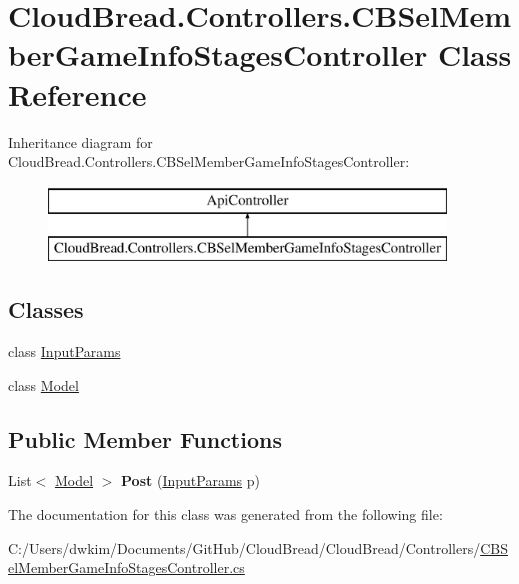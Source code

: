 \hypertarget{a00052}{}\section{Cloud\+Bread.\+Controllers.\+C\+B\+Sel\+Member\+Game\+Info\+Stages\+Controller Class Reference}
\label{a00052}
Inheritance diagram for Cloud\+Bread.\+Controllers.\+C\+B\+Sel\+Member\+Game\+Info\+Stages\+Controller\+:\begin{figure}[H]
\begin{center}
\leavevmode
\includegraphics[height=2.000000cm]{a00052}
\end{center}
\end{figure}
\subsection*{Classes}
\begin{DoxyCompactItemize}
\item 
class \hyperlink{a00096}{Input\+Params}
\item 
class \hyperlink{a00154}{Model}
\end{DoxyCompactItemize}
\subsection*{Public Member Functions}
\begin{DoxyCompactItemize}
\item 
List$<$ \hyperlink{a00154}{Model} $>$ {\bfseries Post} (\hyperlink{a00096}{Input\+Params} p)\hypertarget{a00052_a115131232527678f913beb72c337143e}{}\label{a00052_a115131232527678f913beb72c337143e}

\end{DoxyCompactItemize}


The documentation for this class was generated from the following file\+:\begin{DoxyCompactItemize}
\item 
C\+:/\+Users/dwkim/\+Documents/\+Git\+Hub/\+Cloud\+Bread/\+Cloud\+Bread/\+Controllers/\hyperlink{a00223}{C\+B\+Sel\+Member\+Game\+Info\+Stages\+Controller.\+cs}\end{DoxyCompactItemize}
